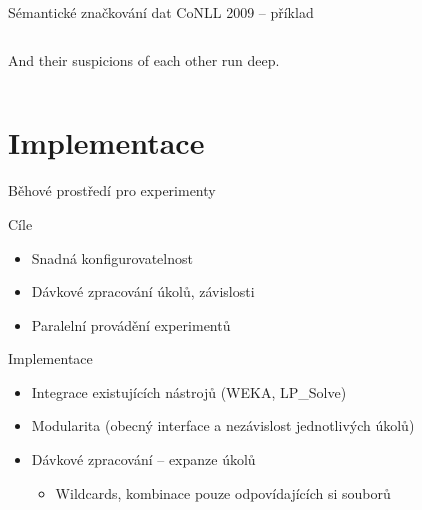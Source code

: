 \documentclass[hyperref={unicode=true}]{beamer}
\begin{document}
\begin{frame}{Sémantické značkování dat CoNLL 2009 -- příklad}
\begin{columns}
\begin{column}{0.4\textwidth}
\begin{center}
    And their suspicions of each other run deep.
    \end{center}
    \end{column}
    \end{columns}
\end{frame}

\section{Implementace}

\begin{frame}{Běhové prostředí pro experimenty}
    \begin{block}{Cíle}
    \begin{itemize}
        \item Snadná konfigurovatelnost
        \item Dávkové zpracování úkolů, závislosti
        \item Paralelní provádění experimentů
    \end{itemize}
    \end{block}
    \begin{block}{Implementace}
    \begin{itemize}
        \item Integrace existujících nástrojů (WEKA, LP\_Solve)
        \item Modularita (obecný interface a nezávislost jednotlivých úkolů)
        \item Dávkové zpracování -- expanze úkolů 
        \begin{itemize}\item Wildcards, kombinace pouze odpovídajících si souborů \end{itemize}
    \end{itemize}
    \end{block}          
\end{frame}
\end{document}
